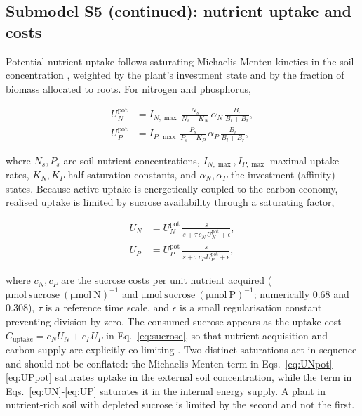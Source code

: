 \documentclass[a4paper,fleqn]{cas-sc}
\begin{document}
\subsection{Submodel S5 (continued): nutrient uptake and costs}
\label{sec:nutrients}

Potential nutrient uptake follows saturating Michaelis-Menten kinetics in
the soil concentration \citep{Epstein1952,Tinker2000}, weighted by the
plant's investment state and by the fraction of biomass allocated to
roots. For nitrogen and phosphorus,

\begin{align}
U_N^{\text{pot}} &=
I_{N,\max}\,
\frac{N_s}{N_s + K_N}\,
\alpha_N\,
\frac{B_r}{B_l+B_r},
\label{eq:UNpot}\\[4pt]
U_P^{\text{pot}} &=
I_{P,\max}\,
\frac{P_s}{P_s + K_P}\,
\alpha_P\,
\frac{B_r}{B_l+B_r},
\label{eq:UPpot}
\end{align}

where $N_s,P_s$ are soil nutrient concentrations, $I_{N,\max},I_{P,\max}$
maximal uptake rates, $K_N,K_P$ half-saturation constants, and
$\alpha_N,\alpha_P$ the investment (affinity) states. Because active
uptake is energetically coupled to the carbon economy, realised uptake is
limited by sucrose availability through a saturating factor,

\begin{align}
U_N &=
U_N^{\text{pot}}\,
\frac{s}{s + \tau\,c_N\,U_N^{\text{pot}} + \epsilon},
\label{eq:UN}\\[4pt]
U_P &=
U_P^{\text{pot}}\,
\frac{s}{s + \tau\,c_P\,U_P^{\text{pot}} + \epsilon},
\label{eq:UP}
\end{align}

where $c_N,c_P$ are the sucrose costs per unit nutrient acquired
($\mathrm{\mu mol\ sucrose\ (\mu mol\ N)^{-1}}$ and
$\mathrm{\mu mol\ sucrose\ (\mu mol\ P)^{-1}}$; numerically $0.68$ and
$0.308$), $\tau$ is a reference time scale, and $\epsilon$ is a small
regularisation constant preventing division by zero. The consumed sucrose
appears as the uptake cost
$C_{\text{uptake}} = c_N U_N + c_P U_P$ in
Eq.~\eqref{eq:sucrose}, so that nutrient acquisition and carbon supply are
explicitly co-limiting \citep{Smith2007}. Two distinct saturations act in
sequence and should not be conflated: the Michaelis-Menten term in
Eqs.~\eqref{eq:UNpot}-\eqref{eq:UPpot} saturates uptake in the external
soil concentration, while the term in
Eqs.~\eqref{eq:UN}-\eqref{eq:UP} saturates it in the internal energy
supply. A plant in nutrient-rich soil with depleted sucrose is limited by
the second and not the first.
\end{document}
